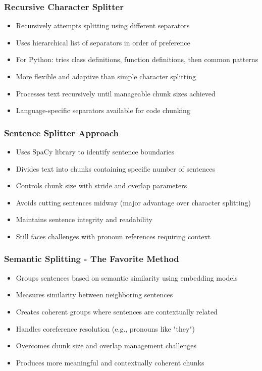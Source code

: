 \begin{frame}[fragile]\frametitle{Recursive Character Splitter}
      \begin{itemize}
\item Recursively attempts splitting using different separators
\item Uses hierarchical list of separators in order of preference
\item For Python: tries class definitions, function definitions, then common patterns
\item More flexible and adaptive than simple character splitting
\item Processes text recursively until manageable chunk sizes achieved
\item Language-specific separators available for code chunking
  \end{itemize}
\end{frame}

\begin{frame}[fragile]\frametitle{Sentence Splitter Approach}
      \begin{itemize}
\item Uses SpaCy library to identify sentence boundaries
\item Divides text into chunks containing specific number of sentences
\item Controls chunk size with stride and overlap parameters
\item Avoids cutting sentences midway (major advantage over character splitting)
\item Maintains sentence integrity and readability
\item Still faces challenges with pronoun references requiring context
  \end{itemize}
\end{frame}

\begin{frame}[fragile]\frametitle{Semantic Splitting - The Favorite Method}
      \begin{itemize}
\item Groups sentences based on semantic similarity using embedding models
\item Measures similarity between neighboring sentences
\item Creates coherent groups where sentences are contextually related
\item Handles coreference resolution (e.g., pronouns like "they")
\item Overcomes chunk size and overlap management challenges
\item Produces more meaningful and contextually coherent chunks
  \end{itemize}
\end{frame}

